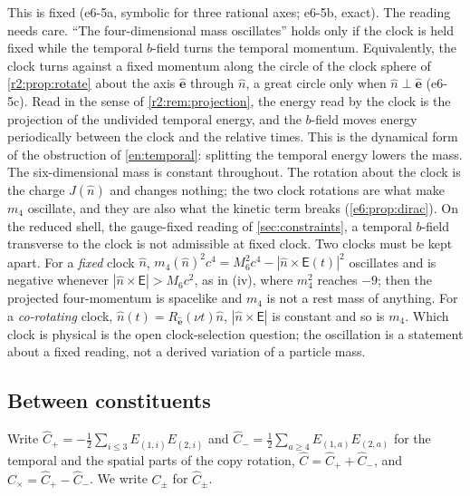 This is fixed (e6-5a, symbolic for three rational axes; e6-5b, exact). The reading needs care. ``The four-dimensional mass oscillates'' holds only
if the clock is held fixed while the temporal $b$-field turns the temporal momentum. Equivalently, the clock turns against a fixed momentum along the
circle of the clock sphere of \cref{r2:prop:rotate} about the axis $\hat{\mathbf e}$ through $\hat n$, a great circle only when $\hat n\perp\hat{\mathbf e}$ (e6-5c). Read in the sense of \cref{r2:rem:projection}, the energy read by the clock is
the projection of the undivided temporal energy, and the $b$-field moves energy periodically between the clock and the relative times. This is the
dynamical form of the obstruction of \cref{en:temporal}: splitting the temporal energy lowers the mass. The six-dimensional mass is
constant throughout. The rotation about the clock is the charge $J(\hat n)$ and changes nothing; the two clock rotations are what make $m_4$ oscillate, and
they are also what the kinetic term breaks (\cref{e6:prop:dirac}). On the reduced shell, the gauge-fixed reading of \cref{sec:constraints}, a temporal $b$-field
transverse to the clock is not admissible at fixed clock. Two clocks must be kept apart. For a \emph{fixed} clock $\hat n$, $m_4(\hat n)^2c^4=M_6^2c^4-|\hat n\times\boldsymbol{\mathsf E}(t)|^2$ oscillates and is negative whenever $|\hat n\times\boldsymbol{\mathsf E}|>M_6 c^2$, as in (iv), where $m_4^2$ reaches $-9$; then the projected four-momentum is spacelike and $m_4$ is not a rest mass of anything. For a \emph{co-rotating} clock, $\hat n(t)=R_{\hat{\mathbf e}}(\nu t)\hat n$, $|\hat n\times\boldsymbol{\mathsf E}|$ is constant and so is $m_4$. Which clock is physical is the open clock-selection question; the oscillation is a statement about a fixed reading, not a derived variation of a particle mass.

\subsection{Between constituents}
\label{e6:sec:copies}

Write $\hat C_+=-\tfrac12\sum_{i\le3}E_{(1,i)}E_{(2,i)}$ and $\hat C_-=\tfrac12\sum_{a\ge4}E_{(1,a)}E_{(2,a)}$ for the temporal and the spatial parts of the copy rotation,
$\hat C=\hat C_++\hat C_-$, and $C_\times=\hat C_+-\hat C_-$. We write $C_\pm$ for $\hat C_\pm$.

